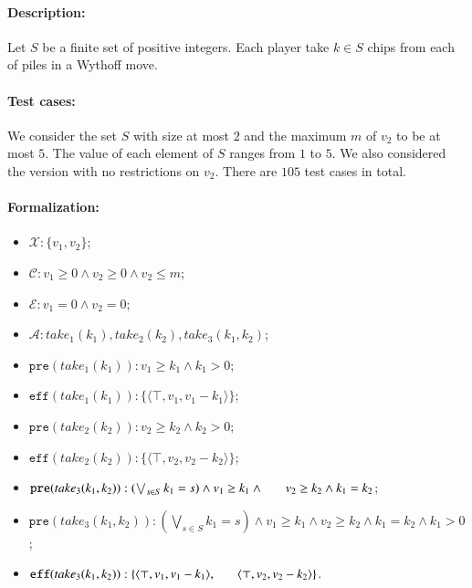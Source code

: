 \documentclass[review]{elsarticle}
\newcommand{\set}[1]{\{ #1 \}}
\newcommand{\tuple}[1]{\langle {#1} \rangle}
\newcommand{\true}{\top}
\newcommand{\statevar}{\mathcal{X}}
\newcommand{\act}{\mathcal{A}}
\newcommand{\constraint}{\mathcal{C}}
\newcommand{\estate}{\mathcal{E}}
\newcommand{\pre}{\mathtt{pre}}
\newcommand{\eff}{\mathtt{eff}}
\begin{document}
\paragraph{Description:}
Let $S$ be a finite set of positive integers.
Each player take $k \in S$ chips from each of piles in a Wythoff move.  %
\paragraph{Test cases:}
We consider the set $S$ with size at most $2$ and the maximum $m$ of $v_2$ to be at most $5$.
The value of each element of $S$ ranges from $1$ to $5$.
We also considered the version with no restrictions on $v_2$.
There are $105$ test cases in total.


\paragraph{Formalization:}
\begin{itemize}
	\item $\statevar: \set{v_1, v_2}$;
	\item $\constraint: v_1 \ge 0 \wedge v_2 \ge 0 \wedge v_2 \le m$;
	\item $\estate: v_1 = 0 \wedge v_2 = 0$;
	\item $\act:take_1(k_1), take_2(k_2), take_3(k_1,k_2)$;
	\item $\pre(take_1(k_1)) : v_1 \ge k_1 \wedge   k_1 > 0$;
	\item $\eff(take_1(k_1)) :  \set{\tuple{\true, v_1 , v_1 -k_1}}$;
	\item $\pre(take_2(k_2)) : v_2 \ge k_2 \wedge  k_2 > 0 $;
	\item $\eff(take_2(k_2)) :  \set{\tuple{\true, v_2 , v_2 -k_2}}$;
	\item $\pre(take_3(k_1, k_2)) : (\bigvee_{s \in S} k_1 = s)  \wedge v_1 \ge k_1 \wedge \\ \hspace*{6mm} v_2 \ge k_2 \wedge k_1 = k_2$;
	\item {\color{red}$\pre(take_3(k_1, k_2)) : (\bigvee_{s \in S} k_1 = s) \wedge v_1 \ge k_1 \wedge v_2 \ge k_2 \wedge k_1 = k_2 \wedge k_1 > 0$;}
	\item $\eff(take_3(k_1, k_2)) :  \set{\tuple{\true, v_1 , v_1 -k_1}, \\ \hspace*{6mm} \tuple{\true, v_2 , v_2 -k_2}}$.
\end{itemize}
\end{document}

